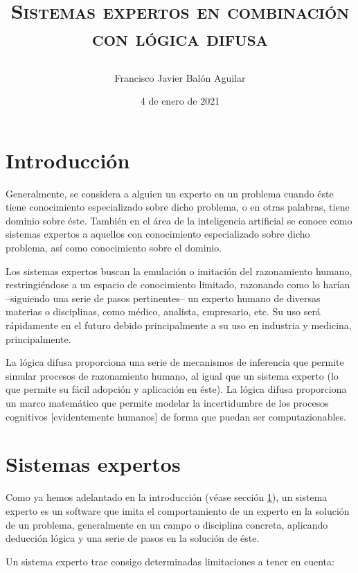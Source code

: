 \documentclass[a4paper, 11pt, titlepage]{article}
\title{{\scshape\Huge Sistemas expertos en combinación con lógica difusa \par}}
\author{Francisco Javier Balón Aguilar}
\date{4 de enero de 2021}
\begin{document}
\maketitle
\renewcommand{\contentsname}{Índice}
\tableofcontents
\listoffigures

\newpage

\section{Introducción}\label{introduccion}

    Generalmente, se considera a alguien un experto en un problema cuando éste tiene
    conocimiento especializado sobre dicho problema, o en otras palabras, tiene dominio 
    sobre éste.  También en el área de la inteligencia artificial se conoce como 
    sistemas expertos a aquellos con conocimiento especializado sobre dicho problema, así 
    como conocimiento sobre el dominio.

    Los sistemas expertos buscan la emulación o imitación del razonamiento humano, 
    restringiéndose a un espacio de conocimiento limitado, razonando como lo harían
    --siguiendo una serie de pasos pertinentes-- un experto humano de diversas materias 
    o disciplinas, como médico, analista, empresario, etc. Su uso será rápidamente en el 
    futuro debido principalmente a su uso en industria y medicina, principalmente.

    La lógica difusa proporciona una serie de mecanismos de inferencia que permite simular 
    procesos de razonamiento humano, al igual que un sistema experto (lo que permite su 
    fácil adopción y aplicación en éste). La lógica difusa proporciona un marco matemático 
    que permite modelar la incertidumbre de los procesos cognitivos [evidentemente humanos]
    de forma que puedan ser computazionables.

\section{Sistemas expertos}

    Como ya hemos adelantado en la introducción (véase sección \ref{introduccion}), un sistema 
    experto es un software que imita el comportamiento de un experto en la solución de un problema, 
    generalmente en un campo o disciplina concreta, aplicando deducción lógica y una serie de 
    pasos en la solución de éste.

    Un sistema experto trae consigo determinadas limitaciones a tener en cuenta:
    
\end{document}
